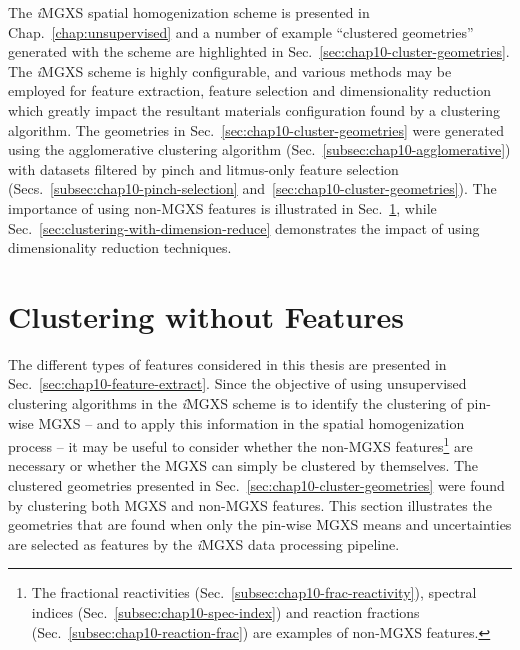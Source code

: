 \begin{appendices}
The \textit{i}\ac{MGXS} spatial homogenization scheme is presented in Chap.~\ref{chap:unsupervised} and a number of example ``clustered geometries'' generated with the scheme are highlighted in Sec.~\ref{sec:chap10-cluster-geometries}. The \textit{i}\ac{MGXS} scheme is highly configurable, and various methods may be employed for feature extraction, feature selection and dimensionality reduction which greatly impact the resultant materials configuration found by a clustering algorithm. The geometries in Sec.~\ref{sec:chap10-cluster-geometries} were generated using the agglomerative clustering algorithm (Sec.~\ref{subsec:chap10-agglomerative}) with datasets filtered by pinch and litmus-only feature selection (Secs.~\ref{subsec:chap10-pinch-selection} and~\ref{sec:chap10-cluster-geometries}). The importance of using non-\ac{MGXS} features is illustrated in Sec.~\ref{sec:clustering-without-features}, while Sec.~\ref{sec:clustering-with-dimension-reduce} demonstrates the impact of using dimensionality reduction techniques.


\section{Clustering without Features}
\label{sec:clustering-without-features}

The different types of features considered in this thesis are presented in Sec.~\ref{sec:chap10-feature-extract}. Since the objective of using unsupervised clustering algorithms in the \textit{i}\ac{MGXS} scheme is to identify the clustering of pin-wise \ac{MGXS} -- and to apply this information in the spatial homogenization process -- it may be useful to consider whether the non-\ac{MGXS} features\footnote{The fractional reactivities (Sec.~\ref{subsec:chap10-frac-reactivity}), spectral indices (Sec.~\ref{subsec:chap10-spec-index}) and reaction fractions (Sec.~\ref{subsec:chap10-reaction-frac}) are examples of non-\ac{MGXS} features.} are necessary or whether the \ac{MGXS} can simply be clustered by themselves. The clustered geometries presented in Sec.~\ref{sec:chap10-cluster-geometries} were found by clustering both \ac{MGXS} and non-\ac{MGXS} features. This section illustrates the geometries that are found when only the pin-wise \ac{MGXS} means and uncertainties are selected as features by the \textit{i}\ac{MGXS} data processing pipeline.


\end{appendices}
